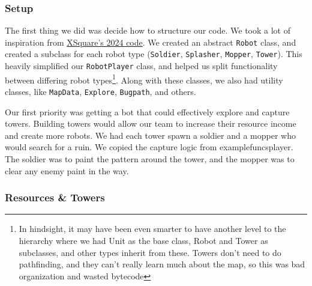 \subsubsection{Setup}

The first thing we did was decide how to structure our code. We took a lot of inspiration from \href{https://github.com/IvanGeffner/BTC24}{XSquare's 2024 code}. We created an abstract \verb|Robot| class, and created a subclass for each robot type (\verb|Soldier|, \verb|Splasher|, \verb|Mopper|, \verb|Tower|). This heavily simplified our \verb|RobotPlayer| class, and helped us split functionality between differing robot types\footnote{In hindsight, it may have been even smarter to have another level to the hierarchy where we had Unit as the base class, Robot and Tower as subclasses, and other types inherit from these. Towers don't need to do pathfinding, and they can't really learn much about the map, so this was bad organization and wasted bytecode}. Along with these classes, we also had utility classes, like \verb|MapData|, \verb|Explore|, \verb|Bugpath|, and others.

\medskip

Our first priority was getting a bot that could effectively explore and capture towers. Building towers would allow our team to increase their resource income and create more robots. We had each tower spawn a soldier and a mopper who would search for a ruin. We copied the capture logic from examplefuncsplayer. The soldier was to paint the pattern around the tower, and the mopper was to clear any enemy paint in the way.

\subsubsection{Resources \& Towers}

